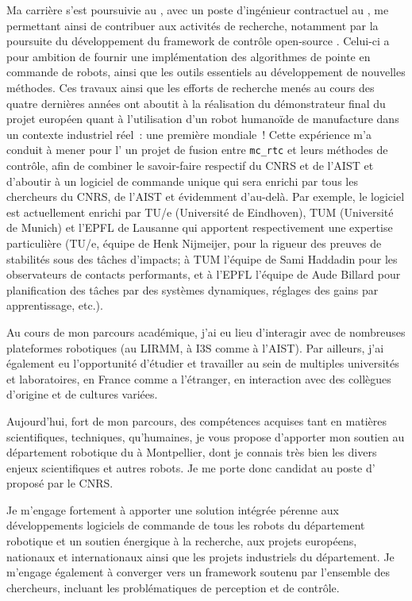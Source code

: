 \documentclass[11pt, a4paper]{awesome-cv}
\begin{document}
\begin{cvletter}
Ma carrière s'est poursuivie au , avec un poste d'ingénieur contractuel au , me permettant ainsi de contribuer aux activités de recherche, notamment par la poursuite du développement du framework de contrôle open-source . Celui-ci a pour ambition de fournir une implémentation des algorithmes de pointe en commande de robots, ainsi que les outils essentiels au développement de nouvelles méthodes. Ces travaux ainsi que les efforts de recherche menés au cours des quatre dernières années ont aboutit à la réalisation du démonstrateur final du projet européen  quant à l'utilisation d'un robot humanoïde de manufacture dans un contexte industriel réel~: une première mondiale~! Cette expérience m'a conduit à mener pour l' un projet de fusion entre {\tt mc\_rtc} et leurs méthodes de contrôle, afin de combiner le savoir-faire respectif du CNRS et de l'AIST et d'aboutir à un logiciel de commande unique qui sera enrichi par tous les chercheurs du CNRS, de l'AIST et évidemment d'au-delà. Par exemple, le logiciel est actuellement enrichi par TU/e (Université de Eindhoven), TUM (Université de Munich) et l'EPFL de Lausanne qui apportent respectivement une expertise particulière (TU/e, équipe de Henk Nijmeijer, pour la rigueur des preuves de stabilités sous des tâches d'impacts; à TUM l'équipe de Sami Haddadin pour les observateurs de contacts performants, et à l'EPFL l'équipe de Aude Billard pour planification des tâches par des systèmes dynamiques, réglages des gains par apprentissage, etc.).  

Au cours de mon parcours académique, j'ai eu lieu d'interagir avec de nombreuses plateformes robotiques (au LIRMM, à I3S comme à l'AIST). Par ailleurs, j'ai également eu l'opportunité d'étudier et travailler au sein de multiples universités et laboratoires, en France comme a l'étranger, en interaction avec des collègues d'origine et de cultures variées.

Aujourd'hui, fort de mon parcours, des compétences acquises tant en matières scientifiques, techniques, qu'humaines, je vous propose d'apporter mon soutien au département robotique du  à Montpellier, dont je connais très bien les divers enjeux scientifiques et autres robots. Je me porte donc candidat au poste d' proposé par le CNRS. 

Je m'engage fortement à apporter une solution intégrée pérenne aux développements logiciels de commande de tous les robots du département robotique et un soutien énergique à la recherche, aux projets européens, nationaux et internationaux ainsi que les projets industriels du département. Je m'engage également à converger vers un framework soutenu par l'ensemble des chercheurs, incluant les problématiques de perception et de contrôle. 

\end{cvletter}


\makeletterclosing
\end{document}
